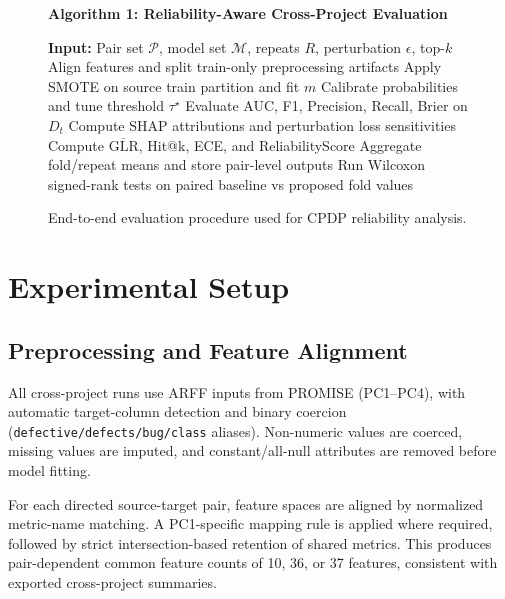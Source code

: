 \documentclass[conference]{IEEEtran}
\begin{document}
\begin{figure}[t]
\centering
\begin{minipage}{0.96\columnwidth}
\footnotesize
\textbf{Algorithm 1: Reliability-Aware Cross-Project Evaluation}
\begin{algorithmic}[1]
\STATE \textbf{Input:} Pair set \(\mathcal{P}\), model set \(\mathcal{M}\), repeats \(R\), perturbation \(\epsilon\), top-\(k\)
    \STATE Align features and split train-only preprocessing artifacts
            \STATE Apply SMOTE on source train partition and fit \(m\)
            \STATE Calibrate probabilities and tune threshold \(\tau^\star\)
            \STATE Evaluate AUC, F1, Precision, Recall, Brier on \(D_t\)
            \STATE Compute SHAP attributions and perturbation loss sensitivities
            \STATE Compute \(\overline{\text{GLR}}\), Hit@k, ECE, and ReliabilityScore
        \ENDFOR
        \STATE Aggregate fold/repeat means and store pair-level outputs
    \ENDFOR
\ENDFOR
\STATE Run Wilcoxon signed-rank tests on paired baseline vs proposed fold values
\end{algorithmic}
\end{minipage}
\caption{End-to-end evaluation procedure used for CPDP reliability analysis.}
\label{alg:cpdp_reliability}
\end{figure}

\section{Experimental Setup}
\subsection{Preprocessing and Feature Alignment}
All cross-project runs use ARFF inputs from PROMISE (PC1--PC4), with automatic target-column detection and binary coercion (\texttt{defective/defects/bug/class} aliases). Non-numeric values are coerced, missing values are imputed, and constant/all-null attributes are removed before model fitting.

For each directed source-target pair, feature spaces are aligned by normalized metric-name matching. A PC1-specific mapping rule is applied where required, followed by strict intersection-based retention of shared metrics. This produces pair-dependent common feature counts of 10, 36, or 37 features, consistent with exported cross-project summaries.
\end{document}
